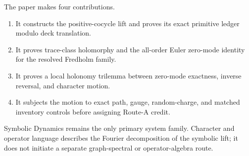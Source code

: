 The paper makes four contributions.
\begin{enumerate}
 \item It constructs the positive-cocycle lift and proves its exact primitive
       ledger modulo deck translation.
 \item It proves trace-class holomorphy and the all-order Euler zero-mode
       identity for the resolved Fredholm family.
 \item It proves a local holonomy trilemma between zero-mode exactness,
       inverse reversal, and character motion.
 \item It subjects the motion to exact path, gauge, random-charge, and matched
       inventory controls before assigning Route-A credit.
\end{enumerate}

Symbolic Dynamics remains the only primary system family.  Character and
operator language describes the Fourier decomposition of the symbolic lift;
it does not initiate a separate graph-spectral or operator-algebra route.
